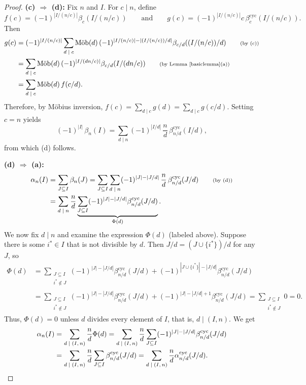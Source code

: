 \documentclass[12pt]{article}
\newcommand{\since}[1]{\tag*{\scriptsize{(#1)}}}
\newcommand{\alphacyc}{\alpha^{\text{cyc}}}
\newcommand{\betacyc}{\beta^{\text{cyc}}}
\DeclareMathOperator{\mob}{M\ddot{o}b}
\theoremstyle{definition}
\begin{document}
\begin{proof}
\smallskip


\noindent\textbf{(c) $\Rightarrow$ (d): } Fix $n$ and $I$. For $c \mid n$, define
\[ f(c) = (-1)^{|I/(n/c)|} \beta_c(I/(n/c)) \qquad \text{and} \qquad g(c) = (-1)^{|I/(n/c)|} c\,\betacyc_c(I/(n/c)). \]
Then
\begin{align*} g(c) &= (-1)^{|I/(n/c)|}\sum_{\text{$d \mid c$}} \mob(d)\,(-1)^{|I/(n/c)| - |(I/(n/c))/d|} \beta_{c/d}((I/(n/c))/d) \since{by (c)} \\
&= \sum_{\text{$d \mid c$}} \mob(d)\,(-1)^{|I/(dn/c)|} \beta_{c/d}(I/(dn/c)) \since{by Lemma \ref{basiclemma}(a)} \\
&= \sum_{\text{$d \mid c$}} \mob(d)\,f(c/d).
\end{align*}
Therefore, by M\"obius inversion, $f(c) = \sum_{\text{$d \mid c$}} g(d) = \sum_{\text{$d \mid c$}} g(c/d)$. Setting $c = n$ yields
\[ (-1)^{|I|}\,\beta_n(I) = \sum_{\text{$d \mid n$}} (-1)^{|I/d|}\,\frac{n}{d}\,\betacyc_{n/d}(I/d), \]
from which (d) follows.

\smallskip


\noindent\textbf{(d) $\Rightarrow$ (a): }
\begin{align*}
\alpha_n(I) &= \sum_{J \subseteq I} \beta_n(J) = \sum_{J \subseteq I} \sum_{\text{$d\mid n$}} (-1)^{|J|-|J/d|}\,\frac{n}{d}\,\betacyc_{n/d}(J/d) \since{by (d)} \\
&= \sum_{\text{$d\mid n$}} \frac{n}{d} \underbrace{\sum_{J \subseteq I} (-1)^{|J|-|J/d|}\betacyc_{n/d}(J/d)}_{\Phi(d)}.
\end{align*}
We now fix $d \mid n$ and examine the expression $\Phi(d)$ (labeled above). Suppose there is some $i^* \in I$ that is not divisible by $d$. Then $J/d = (J \cup \{i^*\})/d$ for any $J$, so
\begin{align*}
\Phi(d) &= \sum_{\substack{J \subseteq I\\i^* \not\in J}} (-1)^{|J|-|J/d|}\betacyc_{n/d}(J/d) + (-1)^{|J\cup\{i^*\}| - |J/d|}\betacyc_{n/d}(J/d) \\
&= \sum_{\substack{J \subseteq I\\i^* \not\in J}} (-1)^{|J|-|J/d|}\betacyc_{n/d}(J/d) + (-1)^{|J| - |J/d| + 1}\betacyc_{n/d}(J/d) = \sum_{\substack{J \subseteq I\\i^* \not\in J}} 0 = 0.
\end{align*}
Thus, $\Phi(d) = 0$ unless $d$ divides every element of $I$, that is, $d \mid (I,n)$. We get
\begin{align*}
\alpha_n(I) &= \sum_{\text{$d \mid (I,n)$}} \frac{n}{d} \Phi(d) = \sum_{\text{$d \mid (I,n)$}} \frac{n}{d} \sum_{J \subseteq I} (-1)^{|J|-|J/d|}\betacyc_{n/d}(J/d) \\
&= \sum_{\text{$d \mid (I,n)$}} \frac{n}{d} \sum_{J \subseteq I} \betacyc_{n/d}(J/d) 
= \sum_{\text{$d \mid (I,n)$}} \frac{n}{d} \alphacyc_{n/d}(J/d). \qedhere
\end{align*}\end{proof}
\end{document}
